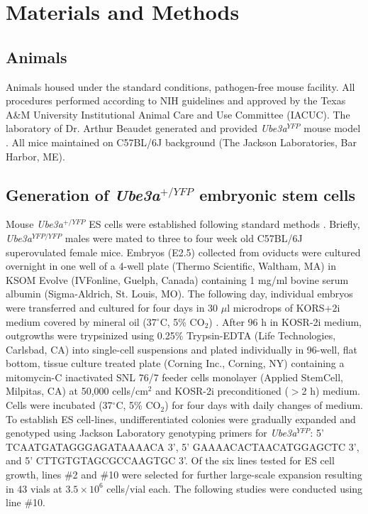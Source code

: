 \section{Materials and Methods}

\subsection{Animals}

Animals housed under the standard conditions, pathogen-free mouse facility. All procedures performed according to NIH guidelines and approved by the Texas A\&M University Institutional Animal Care and Use Committee (IACUC). The laboratory of Dr. Arthur Beaudet generated and provided \textit{Ube3a$^{YFP}$} mouse model \cite{Dindot2008}. All mice maintained on C57BL/6J background (The Jackson Laboratories, Bar Harbor, ME).

\subsection{Generation of \textit{Ube3a$^{+/YFP}$} embryonic stem cells}

Mouse \textit{Ube3a$^{+/YFP}$} ES cells were established following standard methods \cite{Behringer2014,Conner2001,Czechanski2014,Luo2011,Nagy2003}. Briefly, \textit{Ube3a$^{YFP/YFP}$} males were mated to three to four week old C57BL/6J superovulated female mice. Embryos (E2.5) collected from oviducts were cultured overnight in one well of a 4-well plate (Thermo Scientific, Waltham, MA) in KSOM Evolve (IVFonline, Guelph, Canada) containing 1 mg/ml bovine serum albumin (Sigma-Aldrich, St. Louis, MO). The following day, individual embryos were transferred and cultured for four days in 30 $\mu$l microdrops of KORS+2i medium covered by mineral oil (37$^{\circ}$C, 5\% CO$_2$) \cite{Gertsenstein2010,Luo2011}. After 96 h in KOSR-2i medium, outgrowths were trypsinized using 0.25\% Trypsin-EDTA (Life Technologies, Carlsbad, CA) into single-cell suspensions and plated individually in 96-well, flat bottom, tissue culture treated plate (Corning Inc., Corning, NY) containing a mitomycin-C inactivated SNL 76/7 feeder cells monolayer \cite{McMahon1990,Okita2007,Takahashi2007,Takahashi2009} (Applied StemCell, Milpitas, CA) at 50,000 cells/cm$^{2}$ and KOSR-2i preconditioned ($>$2 h) medium. Cells were incubated (37$^{\circ}$C, 5\% CO$_2$) for four days with daily changes of medium. To establish ES cell-lines, undifferentiated colonies were gradually expanded and genotyped using Jackson Laboratory genotyping primers for \textit{Ube3a$^{YFP}$}: 5' TCAATGATAGGGAGATAAAACA 3', 5' GAAAACACTAACATGGAGCTC 3', and 5' CTTGTGTAGCGCCAAGTGC 3'. Of the six lines tested for ES cell growth, lines \#2 and \#10 were selected for further large-scale expansion resulting in 43 vials at $3.5 \times 10^6$ cells/vial each. The following studies were conducted using line \#10.

